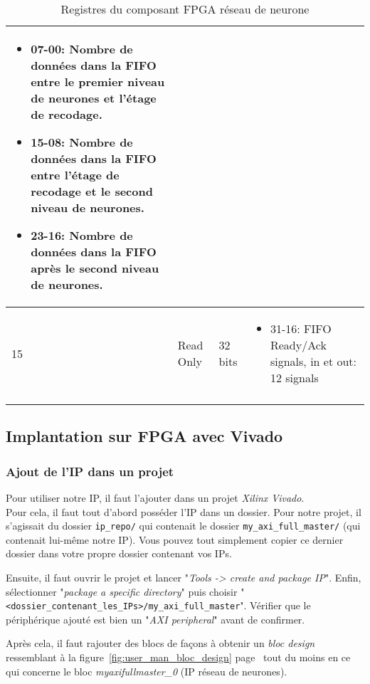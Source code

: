 \begin{longtable}{| p{} | p{} | p{} | p{} |}
\begin{itemize}
		\item 07-00: Nombre de données dans la FIFO entre le premier niveau de neurones et l'étage de recodage.
		\item 15-08: Nombre de données dans la FIFO entre l'étage de recodage et le second niveau de neurones.
		\item 23-16: Nombre de données dans la FIFO après le second niveau de neurones.
	\end{itemize}\\ \hline
	15 & Read Only & 32 bits &
	\begin{itemize}
		\item 31-16: FIFO Ready/Ack signals, in et out: 12 signals
	\end{itemize}\\ \hline
\caption{Registres du composant FPGA réseau de neurone}
\label{fig:user_manual_registers}
\end{longtable}

\subsection{Implantation sur FPGA avec Vivado}

\subsubsection{Ajout de l'IP dans un projet}
Pour utiliser notre IP, il faut l'ajouter dans un projet {\em Xilinx Vivado}.\\

Pour cela, il faut tout d'abord posséder l'IP dans un dossier. Pour notre projet,
il s'agissait du dossier \verb+ip_repo/+ qui contenait le dossier \verb+my_axi_full_master/+
(qui contenait lui-même notre IP). Vous pouvez tout simplement copier ce dernier dossier dans votre propre
dossier contenant vos IPs.

Ensuite, il faut ouvrir le projet et lancer "{\em Tools -> create and package IP}".
Enfin, sélectionner "{\em package a specific directory}" puis choisir "\verb+<dossier_contenant_les_IPs>/my_axi_full_master+".
Vérifier que le périphérique ajouté est bien un "{\em AXI peripheral}" avant de confirmer.

Après cela, il faut rajouter des blocs de façons à obtenir un {\em bloc design} ressemblant à la figure~\ref{fig:user_man_bloc_design} page~\pageref{fig:user_man_bloc_design}
tout du moins en ce qui concerne le bloc {\em myaxifullmaster\_0} (IP réseau de neurones).

